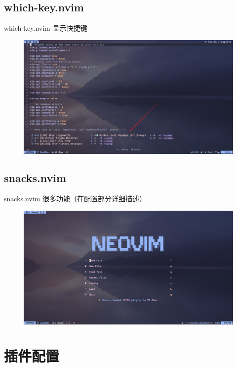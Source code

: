 \documentclass[aspectratio=169]{ctexbeamer}
\begin{document}
  \subsection{which-key.nvim}
    \begin{frame}{which-key.nvim}
      显示快捷键

      \begin{figure}[H]
        \centering
        \includegraphics[width=0.7\linewidth]{./Figures/Which-key_After.jpg}
      \end{figure}

    \end{frame}

  \subsection{snacks.nvim}
    \begin{frame}{snacks.nvim}
      很多功能（在配置部分详细描述）

      \begin{figure}[H]
        \centering
        \includegraphics[width=0.7\linewidth]{./Figures/Snacks_After.jpg}
      \end{figure}

    \end{frame}

\section{插件配置}
\end{document}
